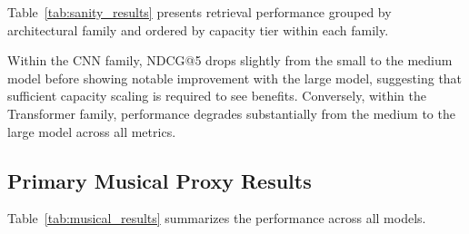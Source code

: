 \documentclass{article}
\begin{document}
Table~\ref{tab:sanity_results} presents retrieval performance grouped by architectural family and ordered by capacity tier within each family.

\begin{table}[!htbp]
\centering
\caption{Sanity Proxy Results (Composer Retrieval). Metrics reported are corpus-level mean values at rank 5.}
\label{tab:sanity_results}
\end{table}

Within the CNN family, NDCG@5 drops slightly from the small to the medium model before showing notable improvement with the large model, suggesting that sufficient capacity scaling is required to see benefits. Conversely, within the Transformer family, performance degrades substantially from the medium to the large model across all metrics.

\subsection{Primary Musical Proxy Results}

Table~\ref{tab:musical_results} summarizes the performance across all models.
\end{document}
